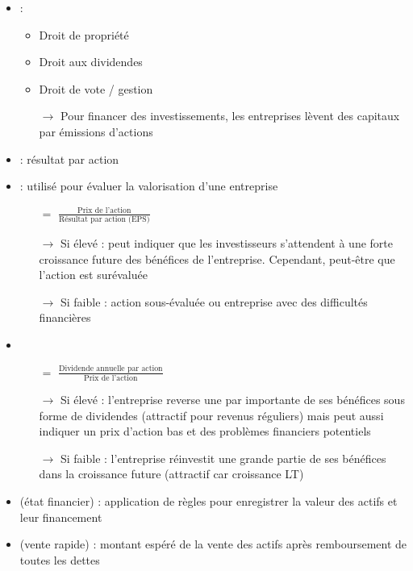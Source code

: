 \begin{itemize}
    \item {} :
    \begin{itemize}
        \item Droit de propriété
        \item Droit aux dividendes
        \item Droit de vote / gestion
        \item[$\rightarrow$] Pour financer des investissements, les entreprises lèvent des capitaux par émissions d'actions
    \end{itemize}
    \item {} : résultat par action
    \item {} : utilisé pour évaluer la valorisation d'une entreprise
    \begin{itemize}
        \item[$=$] $\frac{\text{Prix de l'action}}{\text{Résultat par action (EPS)}}$
        \item[$\rightarrow$] Si élevé : peut indiquer que les investisseurs s'attendent à une forte croissance future des bénéfices de l'entreprise. Cependant, peut-être que l'action est surévaluée
        \item[$\rightarrow$] Si faible : action sous-évaluée ou entreprise avec des difficultés financières
    \end{itemize}
    \item {}
    \begin{itemize}
        \item[$=$] $\frac{\text{Dividende annuelle par action}}{\text{Prix de l'action}}$
        \item[$\rightarrow$] Si élevé : l'entreprise reverse une par importante de ses bénéfices sous forme de dividendes (attractif pour revenus réguliers) mais peut aussi indiquer un prix d'action bas et des problèmes financiers potentiels
        \item[$\rightarrow$] Si faible : l'entreprise réinvestit une grande partie de ses bénéfices dans la croissance future (attractif car croissance LT)
    \end{itemize}
    \item {} (état financier) : application de règles pour enregistrer la valeur des actifs et leur financement
    \item {} (vente rapide) : montant espéré de la vente des actifs après remboursement de toutes les dettes

\end{itemize}
